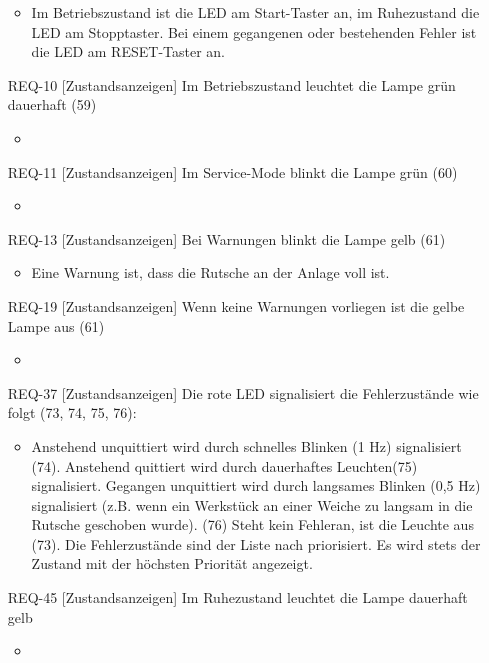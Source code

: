 \begin{itemize}
    \begin{itemize}
        \item Im Betriebszustand ist die LED am Start-Taster an, im Ruhezustand die LED am Stopptaster. Bei einem gegangenen oder bestehenden Fehler ist die LED am RESET-Taster an.
    \end{itemize}
    \item[REQ-10][Zustandsanzeigen] Im Betriebszustand leuchtet die Lampe grün dauerhaft (59)
    \begin{itemize}
        \item
    \end{itemize}
    \item[REQ-11][Zustandsanzeigen] Im Service-Mode blinkt die Lampe grün (60)
    \begin{itemize}
        \item
    \end{itemize}
    \item[REQ-13][Zustandsanzeigen] Bei Warnungen blinkt die Lampe gelb (61)
    \begin{itemize}
        \item Eine Warnung ist, dass die Rutsche an der Anlage voll ist.
    \end{itemize}
    \item[REQ-19][Zustandsanzeigen] Wenn keine Warnungen vorliegen ist die gelbe Lampe aus (61)
    \begin{itemize}
        \item
    \end{itemize}
    \item[REQ-37][Zustandsanzeigen] Die rote LED signalisiert die Fehlerzustände wie folgt (73, 74, 75, 76):
    \begin{itemize}
        \item Anstehend unquittiert wird durch schnelles Blinken (1 Hz) signalisiert (74). Anstehend quittiert wird durch dauerhaftes Leuchten(75) signalisiert. Gegangen unquittiert wird durch langsames Blinken (0,5 Hz) signalisiert (z.B. wenn ein Werkstück an einer Weiche zu langsam in die Rutsche geschoben wurde). (76) Steht kein Fehleran, ist die Leuchte aus (73). Die Fehlerzustände sind der Liste nach priorisiert. Es wird stets der Zustand mit der höchsten Priorität angezeigt.
    \end{itemize}
    \item[REQ-45][Zustandsanzeigen] Im Ruhezustand leuchtet die Lampe dauerhaft gelb
    \begin{itemize}
        \item

\end{itemize}
\end{itemize}
